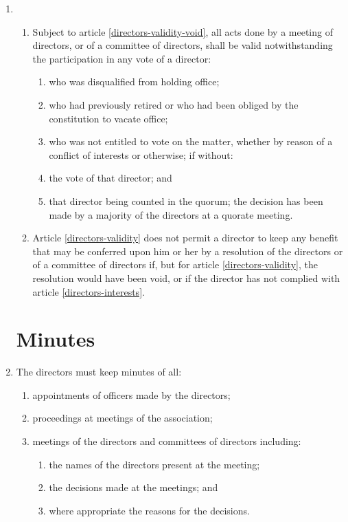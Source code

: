 \begin{enumerate}
\item
  \begin{enumerate}
  \item \label{directors-validity}
    Subject to article \ref{directors-validity-void}, all acts done by a meeting of directors,
    or of a committee of directors, shall be valid notwithstanding the
    participation in any vote of a director:
    \begin{enumerate}
    \item
      who was disqualified from holding office;
    \item
      who had previously retired or who had been obliged by the
      constitution to vacate office;
    \item
      who was not entitled to vote on the matter, whether by reason of a
      conflict of interests or otherwise; if without:
    \item
      the vote of that director; and
    \item
      that director being counted in the quorum; the decision has been
      made by a majority of the directors at a quorate meeting.
    \end{enumerate}
  \item \label{directors-validity-void}
    Article \ref{directors-validity} does not permit a director to
    keep any benefit that may be conferred upon him or her by a
    resolution of the directors or of a committee of directors if, but
    for article \ref{directors-validity}, the resolution would have been void, or if the
    director has not complied with article \ref{directors-interests}.
  \end{enumerate}

\section{Minutes}

\item
The directors must keep minutes of all:
    \begin{enumerate}
        \item
            appointments of officers made by the directors;
        \item
            proceedings at meetings of the association;
        \item
            meetings of the directors and committees of directors including:
            \begin{enumerate}
                \item
                    the names of the directors present at the meeting;
                \item
                    the decisions made at the meetings; and
                \item
                    where appropriate the reasons for the decisions.
            \end{enumerate}
    \end{enumerate}



\end{enumerate}
